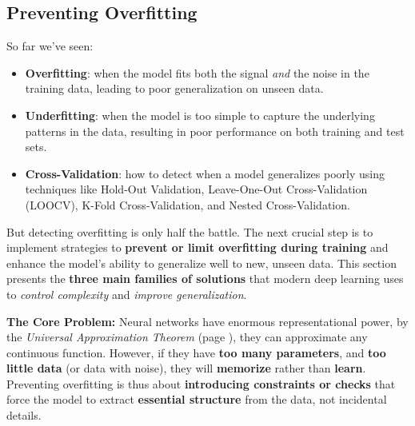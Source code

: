 \subsection{Preventing Overfitting}\label{sec:nn-preventing-overfitting}

So far we've seen:
\begin{itemize}
    \item \textbf{Overfitting}: when the model fits both the signal \emph{and} the noise in the training data, leading to poor generalization on unseen data.
    \item \textbf{Underfitting}: when the model is too simple to capture the underlying patterns in the data, resulting in poor performance on both training and test sets.
    \item \textbf{Cross-Validation}: how to detect when a model generalizes poorly using techniques like Hold-Out Validation, Leave-One-Out Cross-Validation (LOOCV), K-Fold Cross-Validation, and Nested Cross-Validation.
\end{itemize}
But detecting overfitting is only half the battle. The next crucial step is to implement strategies to \textbf{prevent or limit overfitting during training} and enhance the model's ability to generalize well to new, unseen data. This section presents the \textbf{three main families of solutions} that modern deep learning uses to \emph{control complexity} and \emph{improve generalization}.

\highspace
\textcolor{Red2}{ \textbf{The Core Problem:}} Neural networks have enormous representational power, by the \emph{Universal Approximation Theorem} (page \pageref{thm:universal-approximation-theorem}), they can approximate any continuous function. However, if they have \textbf{too many parameters}, and \textbf{too little data} (or data with noise), they will \textbf{memorize} rather than \textbf{learn}. Preventing overfitting is thus about \textbf{introducing constraints or checks} that force the model to extract \textbf{essential structure} from the data, not incidental details.

